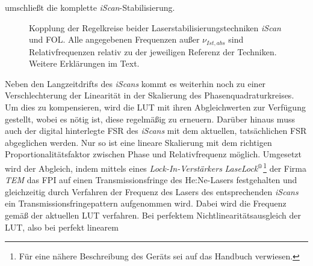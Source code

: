 umschließt die komplette \textit{iScan}-Stabilisierung.\par
\begin{figure}[h]
 	\centering
	\caption[Regelkreis - Kopplung]{Kopplung der Regelkreise beider
	Laserstabilisierungstechniken \textit{iScan} und
	FOL. Alle angegebenen Frequenzen außer $\nu_{Ist,abs}$ sind
	Relativfrequenzen relativ zu der jeweiligen
	Referenz der Techniken. Weitere Erklärungen im Text.}
	\label{fig:regelkreis_kopplung}
\end{figure}
Neben den Langzeitdrifts des \textit{iScans} kommt es weiterhin noch zu
einer Verschlechterung der Linearität in der Skalierung des
Phasenquadraturkreises.
Um dies zu kompensieren, wird die LUT mit ihren Abgleichwerten zur
Verfügung gestellt, wobei es nötig ist, diese regelmäßig zu erneuern.
Darüber hinaus muss auch der digital hinterlegte FSR des \textit{iScans} mit dem
aktuellen, tatsächlichen FSR abgeglichen werden. Nur so ist eine lineare
Skalierung mit dem richtigen Proportionalitätsfaktor zwischen Phase und
Relativfrequenz möglich. Umgesetzt wird der Abgleich, indem mittels eines
\textit{Lock-In-Verstärkers}
\textit{LaseLock$^\text{\textregistered}$}\footnote{Für eine nähere Beschreibung
des Geräts sei auf das Handbuch verwiesen.} der Firma \textit{TEM} \cite{laselock} das FPI auf einen Transmissionsfringe des He:Ne-Lasers festgehalten und gleichzeitig durch Verfahren der Frequenz des Lasers des entsprechenden \textit{iScans} ein Transmissionsfringepattern
aufgenommen wird. Dabei wird die Frequenz gemäß der aktuellen LUT verfahren. Bei
perfektem Nichtlinearitätsausgleich der LUT, also bei perfekt linearem
